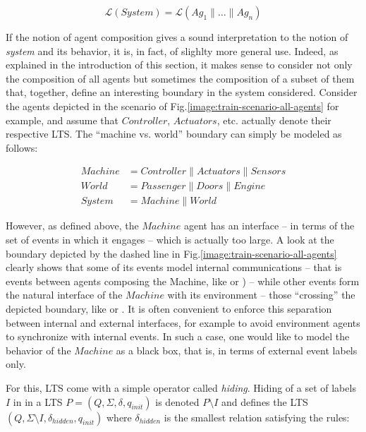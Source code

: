 \begin{equation}
\mathcal{L}(System) = \mathcal{L}(Ag_1 \parallel \ldots \parallel Ag_n)
\label{equation:system-composition}
\end{equation}


If the notion of agent composition gives a sound interpretation to the notion of \emph{system} and its behavior, it is, in fact, of slighlty more general use. Indeed, as explained in the introduction of this section, it makes sense to consider not only the composition of all agents but sometimes the composition of a subset of them that, together, define an interesting boundary in the system considered. Consider the agents depicted in the scenario of Fig.\ref{image:train-scenario-all-agents} for example, and assume that $Controller$, $Actuators$, etc. actually denote their respective LTS. The ``machine vs. world'' boundary can simply be modeled as follows:

\vspace{-0.8cm}
\begin{align*}
Machine &= Controller \parallel Actuators \parallel Sensors \\
World   &= Passenger \parallel Doors \parallel Engine \\
System  &= Machine \parallel World
\end{align*}
\vspace{-0.8cm}

However, as defined above, the $Machine$ agent has an interface -- in terms of the set of events in which it engages -- which is actually too large. A look at the boundary depicted by the dashed line in Fig.\ref{image:train-scenario-all-agents} clearly shows that some of its events model internal communications -- that is events between agents composing the Machine, like  or ) -- while other events form the natural interface of the $Machine$ with its environment -- those ``crossing'' the depicted boundary, like  or . It is often convenient to enforce this separation between internal and external interfaces, for example to avoid environment agents to synchronize with internal events. In such a case, one would like to model the behavior of the $Machine$ as a black box, that is, in terms of external event labels only.

For this, LTS come with a simple operator called \emph{hiding}. Hiding of a set of labels $I$ in in a LTS $P = (Q,\Sigma,\delta,q_{init})$ is denoted $P \setminus I$ and defines the LTS $(Q,\Sigma \setminus I,\delta_{hidden},q_{init})$ where $\delta_{hidden}$ is the smallest relation satisfying the rules:

